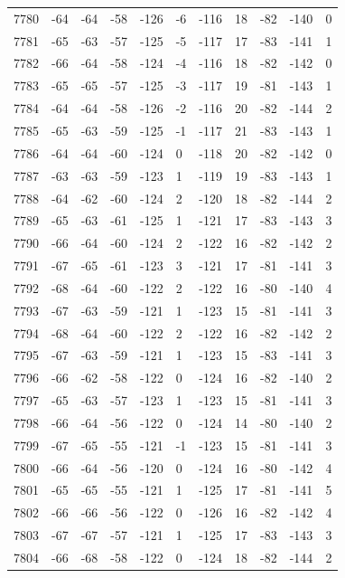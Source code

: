 \begin{table}[H]
\begin{tabular}{lllllllllll}
7780 & -64 & -64 & -58 & -126 & -6 & -116 & 18 & -82 & -140 & 0 \\
7781 & -65 & -63 & -57 & -125 & -5 & -117 & 17 & -83 & -141 & 1 \\
7782 & -66 & -64 & -58 & -124 & -4 & -116 & 18 & -82 & -142 & 0 \\
7783 & -65 & -65 & -57 & -125 & -3 & -117 & 19 & -81 & -143 & 1 \\
7784 & -64 & -64 & -58 & -126 & -2 & -116 & 20 & -82 & -144 & 2 \\
7785 & -65 & -63 & -59 & -125 & -1 & -117 & 21 & -83 & -143 & 1 \\
7786 & -64 & -64 & -60 & -124 & 0 & -118 & 20 & -82 & -142 & 0 \\
7787 & -63 & -63 & -59 & -123 & 1 & -119 & 19 & -83 & -143 & 1 \\
7788 & -64 & -62 & -60 & -124 & 2 & -120 & 18 & -82 & -144 & 2 \\
7789 & -65 & -63 & -61 & -125 & 1 & -121 & 17 & -83 & -143 & 3 \\
7790 & -66 & -64 & -60 & -124 & 2 & -122 & 16 & -82 & -142 & 2 \\
7791 & -67 & -65 & -61 & -123 & 3 & -121 & 17 & -81 & -141 & 3 \\
7792 & -68 & -64 & -60 & -122 & 2 & -122 & 16 & -80 & -140 & 4 \\
7793 & -67 & -63 & -59 & -121 & 1 & -123 & 15 & -81 & -141 & 3 \\
7794 & -68 & -64 & -60 & -122 & 2 & -122 & 16 & -82 & -142 & 2 \\
7795 & -67 & -63 & -59 & -121 & 1 & -123 & 15 & -83 & -141 & 3 \\
7796 & -66 & -62 & -58 & -122 & 0 & -124 & 16 & -82 & -140 & 2 \\
7797 & -65 & -63 & -57 & -123 & 1 & -123 & 15 & -81 & -141 & 3 \\
7798 & -66 & -64 & -56 & -122 & 0 & -124 & 14 & -80 & -140 & 2 \\
7799 & -67 & -65 & -55 & -121 & -1 & -123 & 15 & -81 & -141 & 3 \\
7800 & -66 & -64 & -56 & -120 & 0 & -124 & 16 & -80 & -142 & 4 \\
7801 & -65 & -65 & -55 & -121 & 1 & -125 & 17 & -81 & -141 & 5 \\
7802 & -66 & -66 & -56 & -122 & 0 & -126 & 16 & -82 & -142 & 4 \\
7803 & -67 & -67 & -57 & -121 & 1 & -125 & 17 & -83 & -143 & 3 \\
7804 & -66 & -68 & -58 & -122 & 0 & -124 & 18 & -82 & -144 & 2 \\

\end{tabular}
\end{table}
